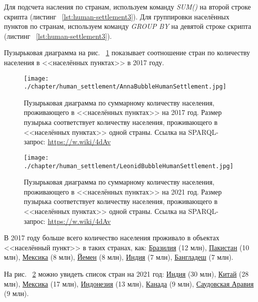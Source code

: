 Для подсчета насления по странам, используем команду \textit{SUM()} на второй строке скрипта (листинг ~\protect\ref{lst:human-settlement3}). Для группировки населённых пунктов по странам, используем команду \textit{GROUP BY} на девятой строке скрипта (листинг ~\protect\ref{lst:human-settlement3}).

Пузырьковая диаграмма на рис. ~\ref{fig:human-settlement-1} показывает соотношение стран по количеству населения в <<населённых пунктах>> в 2017 году.

\begin{figure}
\centering
	\texttt{[image: ./chapter/human\_settlement/AnnaBubbleHumanSettlement.jpg]}
	\label{fig:human-settlement-1}
    \caption[Пузырьковая диаграмма  по суммарному количеству населения в населённых пунктах, 2017.]{Пузырьковая диаграмма  по суммарному количеству населения, проживающего в <<населённых пунктах>> на 2017 год. Размер пузырька соответствует количеству населения, проживающего в <<населённых пунктах>> одной страны. Ссылка на SPARQL-запрос: \href{https://w.wiki/4dAv}{https://w.wiki/4dAv}}
\end{figure}

\begin{figure}
\centering
	\texttt{[image: ./chapter/human\_settlement/LeonidBubbleHumanSettlement.jpg]}
	\label{fig:human-settlement-2}
	\caption[Пузырьковая диаграмма  по суммарному количеству населения в населённых пунктах, 2021.]{Пузырьковая диаграмма  по суммарному количеству населения, проживающего в <<населённых пунктах>> на 2021 год. Размер пузырька соответствует количеству населения, проживающего в <<населённых пунктах>> одной страны. Ссылка на SPARQL-запрос: \href{https://w.wiki/4dAv}{https://w.wiki/4dAv}}
\end{figure}

В 2017 году больше всего количество населения проживало в объектах <<населённый пункт>> в таких странах, как: \href{http://www.wikidata.org/entity/Q155}{Бразилия} (\num{12} млн), \href{http://www.wikidata.org/entity/Q843}{Пакистан} (\num{10} млн), \href{http://www.wikidata.org/entity/Q96}{Мексика} (\num{8} млн), \href{http://www.wikidata.org/entity/Q805}{Йемен} (\num{8} млн), \href{http://www.wikidata.org/entity/Q668}{Индия} (\num{7} млн), \href{http://www.wikidata.org/entity/Q902}{Бангладеш} (\num{7} млн). 

На рис. ~\ref{fig:human-settlement-2} можно увидеть список стран на 2021 год: \href{http://www.wikidata.org/entity/Q668}{Индия} (\num{30} млн), \href{http://www.wikidata.org/entity/Q148}{Китай} (\num{28} млн), \href{http://www.wikidata.org/entity/Q96}{Мексика} (\num{17} млн), \href{http://www.wikidata.org/entity/Q252}{Индонезия} (\num{13} млн), \href{http://www.wikidata.org/entity/Q16}{Канада} (\num{9} млн), \href{http://www.wikidata.org/entity/Q851}{Саудовская Аравия} (\num{9} млн). 

